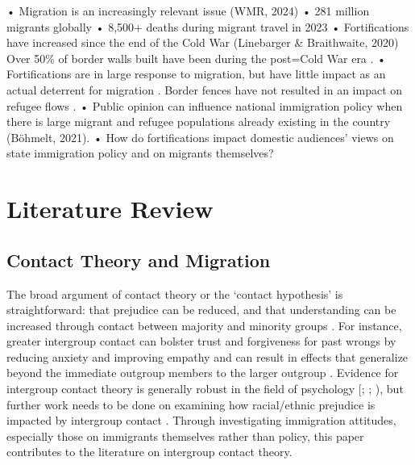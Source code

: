 \documentclass[12pt,]{article}
\begin{document}
• Migration is an increasingly relevant issue (WMR, 2024) • 281 million
migrants globally • 8,500+ deaths during migrant travel in 2023 •
Fortifications have increased since the end of the Cold War (Linebarger
\& Braithwaite, 2020) Over 50\% of border walls built have been during
the post=Cold War era \citep{carter2017}. • Fortifications are in large
response to migration, but have little impact as an actual deterrent for
migration \citep{avdan2023}. Border fences have not resulted in an
impact on refugee flows \citep{avdan2023}. • Public opinion can
influence national immigration policy when there is large migrant and
refugee populations already existing in the country (Böhmelt, 2021). •
How do fortifications impact domestic audiences' views on state
immigration policy and on migrants themselves?

\section{Literature Review}\label{literature-review}

\subsection{Contact Theory and
Migration}\label{contact-theory-and-migration}

The broad argument of contact theory or the `contact hypothesis' is
straightforward: that prejudice can be reduced, and that understanding
can be increased through contact between majority and minority groups
\citep{pettigrew2006, allport1970}. For instance, greater intergroup
contact can bolster trust and forgiveness for past wrongs by reducing
anxiety and improving empathy and can result in effects that generalize
beyond the immediate outgroup members to the larger outgroup
\citep{pettigrew2011}. Evidence for intergroup contact theory is
generally robust in the field of psychology {[}\citet{pettigrew2006};
\citet{paluck2019}; \citet{pettigrew2011}), but further work needs to be
done on examining how racial/ethnic prejudice is impacted by intergroup
contact \citep{paluck2019}. Through investigating immigration attitudes,
especially those on immigrants themselves rather than policy, this paper
contributes to the literature on intergroup contact theory.
\end{document}
